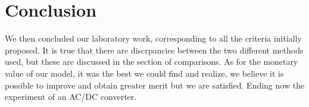 \section{Conclusion}
\label{sec:conclusion} 

We then concluded our laboratory work, corresponding to all the criteria initially proposed. It is true that there are discrpancies between the two different methods used, but these are discussed in the section of comparisons. As for the monetary value of our model, it was the best we could find and realize, we believe it is possible to improve and obtain greater merit but we are satisfied. Ending now the experiment of an AC/DC converter.
